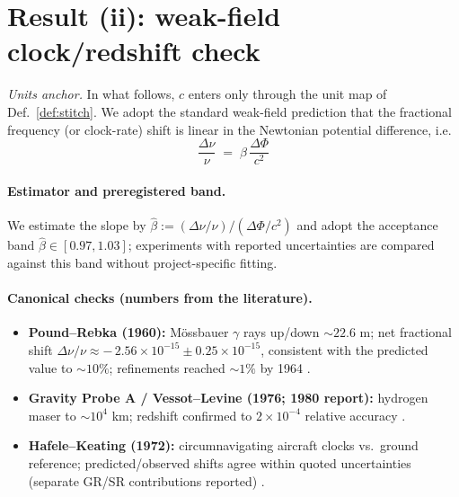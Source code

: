 \section*{Result (ii): weak-field clock/redshift check}
\noindent\emph{Units anchor.} In what follows, $c$ enters only through the unit map of Def.~\ref{def:stitch}.
We adopt the standard weak-field prediction that the fractional frequency (or clock-rate) shift is linear in the
Newtonian potential difference, i.e.
\begin{equation}
\frac{\Delta \nu}{\nu} \;=\; \beta\,\frac{\Delta\Phi}{c^{2}}
\label{eq:redshift_model}
\end{equation}

\paragraph{Estimator and preregistered band.}
We estimate the slope by
$\hat\beta := (\Delta\nu/\nu)/(\Delta\Phi/c^2)$ and adopt the acceptance band $\hat\beta\in[0.97,1.03]$;
experiments with reported uncertainties are compared against this band without project-specific fitting.



\paragraph{Canonical checks (numbers from the literature).}
\begin{itemize}
  \item \textbf{Pound--Rebka (1960):} M\"ossbauer $\gamma$ rays up/down $\sim22.6$ m; net fractional
        shift $\Delta\nu/\nu \approx -\,2.56\times10^{-15}\pm0.25\times10^{-15}$, consistent with the predicted value to $\sim10\%$;
        refinements reached $\sim1\%$ by 1964 \cite{poundrebka1960}.
  \item \textbf{Gravity Probe A / Vessot--Levine (1976; 1980 report):} hydrogen maser to $\sim10^4$ km; redshift confirmed
        to $2\times10^{-4}$ relative accuracy \cite{vessot1980}.
  \item \textbf{Hafele--Keating (1972):} circumnavigating aircraft clocks vs.\ ground reference; predicted/observed shifts
        agree within quoted uncertainties (separate GR/SR contributions reported) \cite{hafelekeating1972}.
\end{itemize}


